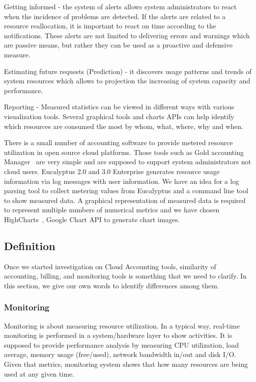 \documentclass{sig-alternate-05-2015}
\begin{document}
Getting informed - the system of alerts allows system administrators to react when the incidence of problems are detected. If the alerts are related to a resource reallocation, it is important to react on time according to the notifications. These alerts are not limited to delivering errors and warnings which are passive means, but rather they can be used as a proactive and defensive measure. 

Estimating future requests (Prediction) - it discovers usage patterns and trends of system resources which allows to projection the increasing of system capacity and performance. 

Reporting - Measured statistics can be viewed in different ways with various visualization tools. Several graphical tools and charts APIs can help identify which resources are consumed the most by whom, what, where, why and when. 

There is a small number of accounting software to provide metered resource utilization in open source cloud platforms. Those tools such as Gold accounting Manager~\cite{jacksongold} are very simple and are supposed to support system administrators not cloud users. Eucalyptus 2.0 and 3.0 Enterprise generates resource usage information via log messages with user information. We have an idea for a log parsing tool to collect metering values from Eucalyptus and a command line tool to show measured data. A graphical representation of measured data is required to represent multiple numbers of numerical metrics and we have chosen HighCharts~\cite{highsoft2012highcharts}, Google Chart API to generate chart images.

\subsection{Definition}

Once we started investigation on Cloud Accounting tools, similarity of accounting, billing, and monitoring tools is something that we need to clarify. In this section, we give our own words to identify differences among them. 

\subsubsection{Monitoring}

Monitoring is about measuring resource utilization. In a typical way, real-time monitoring is performed in a system/hardware layer to show activities. It is supposed to provide performance analysis by measuring CPU utilization, load average, memory usage (free/used), network bandwidth in/out and disk I/O. Given that metrics, monitoring system shows that how many resources are being used at any given time. 
\end{document}
